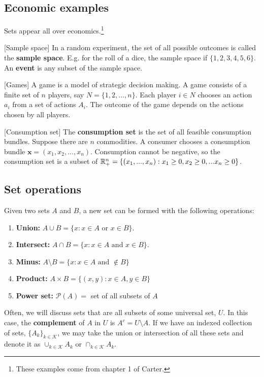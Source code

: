 \subsection{Economic examples}


Sets appear all over economics.\footnote{These examples come
from chapter 1 of Carter.} 
\begin{example}\label{ex:sampleSpace}[Sample space]
  In a random experiment, the set of all possible outcomes is called
  the \textbf{sample space}. E.g. for the roll of a dice, the sample
  space if $\{1,2 ,3 , 4, 5, 6\}$. An \textbf{event} is any subset of
  the sample space.
\end{example}

\begin{example}\label{ex:games}[Games]
  A game is a model of strategic decision making. A game consists of a
  finite set of $n$ players, say $N = \{1,2,..., n\}$. Each player $i
  \in N$ chooses an action $a_i$ from a set of actions $A_i$. The
  outcome of the game depends on the actions chosen by all players. 
\end{example}

\begin{example}\label{ex:conset}[Consumption set]
  The \textbf{consumption set} is the set of all feasible consumption
  bundles. Suppose there are $n$ commodities. A consumer chooses a
  consumption bundle $\mathbf{x} = (x_1, x_2, ..., x_n)$. Consumption
  cannot be negative, so the consumption set is a subset of $\mathbb{R}^n_+ =
  \{(x_1, ..., x_n) : x_1 \geq 0, x_2 \geq 0, ... x_n \geq 0 \}$.
\end{example}

\subsection{Set operations}

Given two sets $A$ and $B$, a new set can be formed with the following
operations:
\begin{enumerate}
\item \textbf{Union:} $A \cup B = \{x: x\in A \text{ or } x \in B\}$.
\item \textbf{Intersect:} $A \cap B = \{x: x \in A \text{ and } x \in
  B\}$. 
\item \textbf{Minus:} $A \setminus B = \{ x: x\in A \text{ and }
  \not\in B \}$
\item \textbf{Product:} $A \times B = \{(x,y): x \in A, y \in B \}$
\item \textbf{Power set:} $\mathcal{P}(A) =$ set of all subsets of $A$ 
\end{enumerate}
Often, we will discuss sets that are all subsets of some universal
set, $U$. In this case, the \textbf{complement} of $A$ in $U$ is $A^c
= U \setminus A$. If we have an indexed collection of sets, $\{A_k
\}_{k \in \mathcal{K}}$, we may take the union or intersection of all
these sets and denote it as $\cup_{k \in \mathcal{K}} A_k $ or
$\cap_{k \in \mathcal{K}} A_k$.


